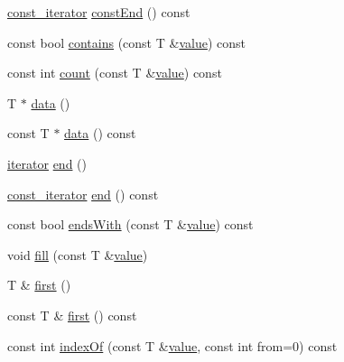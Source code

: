 \begin{DoxyCompactItemize}
\item 
\hyperlink{classprism_1_1containers_1_1_array_a9cf61ea4548f20cae51d2ddcc83f9a16}{const\+\_\+iterator} \hyperlink{classprism_1_1containers_1_1_array_a862a55f4ce9f077537fbd4abf83e1380}{const\+End} () const 
\item 
const bool \hyperlink{classprism_1_1containers_1_1_array_a56542c280b8fed34394a212bd906f883}{contains} (const T \&\hyperlink{classprism_1_1containers_1_1_array_a6fac700f89e79bd35f5c431dda5ad30f}{value}) const 
\item 
const int \hyperlink{classprism_1_1containers_1_1_array_a42c2253bc3df78ec2c19e3a225a2004d}{count} (const T \&\hyperlink{classprism_1_1containers_1_1_array_a6fac700f89e79bd35f5c431dda5ad30f}{value}) const 
\item 
T $\ast$ \hyperlink{classprism_1_1containers_1_1_array_a8997bf0289d0503177ced560674c3632}{data} ()
\item 
const T $\ast$ \hyperlink{classprism_1_1containers_1_1_array_a685e162d5720b5678b7d8fdf3aa989a1}{data} () const 
\item 
\hyperlink{classprism_1_1containers_1_1_array_af5e3ad470f2bb2d24f0f98e12e11a60b}{iterator} \hyperlink{classprism_1_1containers_1_1_array_add6ebe81365655bfdcb144bf52e5bff9}{end} ()
\item 
\hyperlink{classprism_1_1containers_1_1_array_a9cf61ea4548f20cae51d2ddcc83f9a16}{const\+\_\+iterator} \hyperlink{classprism_1_1containers_1_1_array_ab223ac94e2063a93f4bb8f7fe174baa9}{end} () const 
\item 
const bool \hyperlink{classprism_1_1containers_1_1_array_a526b14c57abf816ae086b7b95e59cfb8}{ends\+With} (const T \&\hyperlink{classprism_1_1containers_1_1_array_a6fac700f89e79bd35f5c431dda5ad30f}{value}) const 
\item 
void \hyperlink{classprism_1_1containers_1_1_array_a213834cb2385d9acff60ffe3529c495d}{fill} (const T \&\hyperlink{classprism_1_1containers_1_1_array_a6fac700f89e79bd35f5c431dda5ad30f}{value})
\item 
T \& \hyperlink{classprism_1_1containers_1_1_array_ae57abb3157c1fa3bec48dc990147d4a0}{first} ()
\item 
const T \& \hyperlink{classprism_1_1containers_1_1_array_ad59727b7bf01dd88df21afa1355bf3f0}{first} () const 
\item 
const int \hyperlink{classprism_1_1containers_1_1_array_a48d68b9f2bf6bce83a6ff805fddf3fbf}{index\+Of} (const T \&\hyperlink{classprism_1_1containers_1_1_array_a6fac700f89e79bd35f5c431dda5ad30f}{value}, const int from=0) const 

\end{DoxyCompactItemize}

